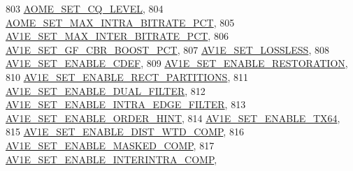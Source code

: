 \begin{DoxyCodeInclude}
{{{{{{{803                                         \hyperlink{group__aom__encoder_ggae78dde67a6d78f332e9bdba0dde42db5af67f265bf63bf8f1268b3a14ae26606c}{AOME\_SET\_CQ\_LEVEL},
804                                         \hyperlink{group__aom__encoder_ggae78dde67a6d78f332e9bdba0dde42db5a9e1965ffa40d2d87556b65748c63adcc}{AOME\_SET\_MAX\_INTRA\_BITRATE\_PCT},
805                                         \hyperlink{group__aom__encoder_ggae78dde67a6d78f332e9bdba0dde42db5a54b7c950e51f39a3cb7344a2665b9929}{AV1E\_SET\_MAX\_INTER\_BITRATE\_PCT},
806                                         \hyperlink{group__aom__encoder_ggae78dde67a6d78f332e9bdba0dde42db5ade327180f01d27d22abd94c1f0a8bc9e}{AV1E\_SET\_GF\_CBR\_BOOST\_PCT},
807                                         \hyperlink{group__aom__encoder_ggae78dde67a6d78f332e9bdba0dde42db5afe875c6bb02f236be503c8c7b1f15875}{AV1E\_SET\_LOSSLESS},
808                                         \hyperlink{group__aom__encoder_ggae78dde67a6d78f332e9bdba0dde42db5a6879fe104e23de00f034ed11eb605031}{AV1E\_SET\_ENABLE\_CDEF},
809                                         \hyperlink{group__aom__encoder_ggae78dde67a6d78f332e9bdba0dde42db5a2ea70b4b379e701a4b3b7cc33eb05e65}{AV1E\_SET\_ENABLE\_RESTORATION},
810                                         \hyperlink{group__aom__encoder_ggae78dde67a6d78f332e9bdba0dde42db5af3db44e9871c69defc5ae2cc6c5e3ba0}{AV1E\_SET\_ENABLE\_RECT\_PARTITIONS},
811                                         \hyperlink{group__aom__encoder_ggae78dde67a6d78f332e9bdba0dde42db5a45867a101866f7ad1a67e7d72f84054a}{AV1E\_SET\_ENABLE\_DUAL\_FILTER},
812                                         \hyperlink{group__aom__encoder_ggae78dde67a6d78f332e9bdba0dde42db5a518cc32bbf169f8e9d4d71e7c1193748}{AV1E\_SET\_ENABLE\_INTRA\_EDGE\_FILTER},
813                                         \hyperlink{group__aom__encoder_ggae78dde67a6d78f332e9bdba0dde42db5ad0eaf349d653c8357acbba84ad95d5e6}{AV1E\_SET\_ENABLE\_ORDER\_HINT},
814                                         \hyperlink{group__aom__encoder_ggae78dde67a6d78f332e9bdba0dde42db5ab6d4110cee235e35452d0beb89a28604}{AV1E\_SET\_ENABLE\_TX64},
815                                         \hyperlink{group__aom__encoder_ggae78dde67a6d78f332e9bdba0dde42db5a80d59744d531d9e0d48c8274792b69dc}{AV1E\_SET\_ENABLE\_DIST\_WTD\_COMP},
816                                         \hyperlink{group__aom__encoder_ggae78dde67a6d78f332e9bdba0dde42db5a643067b985c437490d6248decad39235}{AV1E\_SET\_ENABLE\_MASKED\_COMP},
817                                         \hyperlink{group__aom__encoder_ggae78dde67a6d78f332e9bdba0dde42db5a4032b6c7ad5f4499af95ddaab863d3d6}{AV1E\_SET\_ENABLE\_INTERINTRA\_COMP},
}}}}}}}
\end{DoxyCodeInclude}
